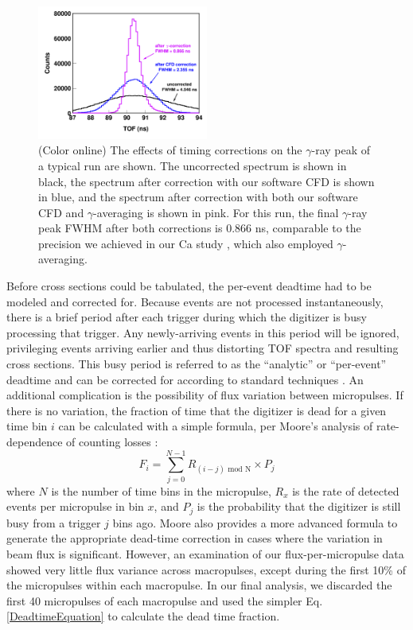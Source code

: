 \documentclass[twocolumn,secnumarabic,amssymb, nobibnotes, aps, prl,
superscriptaddress, nobalancelastpage]{revtex4}
\begin{document}
\begin{figure}
    \includegraphics[width=0.5\textwidth]{figures/TimeCorrections.png}
    \caption{(Color online) The effects of timing corrections on the $\gamma$-ray
        peak of a typical run are shown. The uncorrected spectrum is shown in black,
        the spectrum after correction with our software CFD is shown in blue,
        and the spectrum after correction with both our software CFD and
        $\gamma$-averaging is 
        shown in pink. For this run, the final $\gamma$-ray peak 
        FWHM after both corrections is 0.866 ns, comparable to the precision we
        achieved in our Ca study \cite{Shane2010}, which also employed $\gamma$-
        averaging.
        }
    \label{TimingCorrectionStudy}
\end{figure}

Before cross sections could be tabulated, the per-event deadtime had to be
modeled and corrected for. Because events are not processed
instantaneously, there is a brief period
after each trigger during which the digitizer is busy processing that trigger.
Any newly-arriving events in this period will be ignored,
privileging events arriving earlier and thus distorting
TOF spectra and resulting cross sections. This busy period is referred to as the
``analytic'' or ``per-event'' deadtime and can be corrected for according to standard 
techniques
\cite{Moore1980}. An additional complication is the possibility of flux
variation between micropulses. If there is no variation, the fraction of time
that the digitizer is dead for a given time bin $i$ can be calculated with a
simple formula, per Moore's analysis of rate-dependence of counting losses
\cite{Moore1980}:
\begin{equation}
    F_{i} = \sum^{N-1}_{j=0} R_{(i-j)\text{ mod N}}\times P_{j}
    \label{DeadtimeEquation}
\end{equation}
where $N$ is the number of time bins in the micropulse, $R_{x}$ is the rate of
detected events per micropulse in bin $x$, and $P_{j}$ is the probability that the
digitizer is still busy from a trigger $j$ bins ago.
Moore also provides a more advanced formula to generate the appropriate
dead-time correction in cases where the variation in beam flux 
is significant. However, an examination of our flux-per-micropulse data showed
very little flux variance across macropulses, except during the first 10\%
of the micropulses within each macropulse. In our final analysis, we discarded 
the first 40 micropulses of each 
macropulse and used the simpler Eq. \ref{DeadtimeEquation} to calculate the dead
time fraction.
\end{document}
